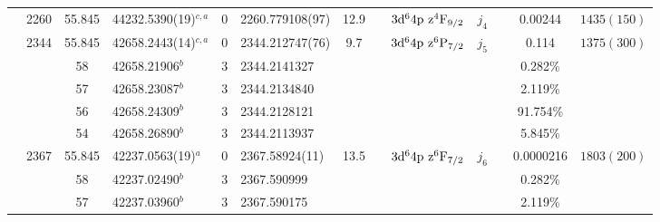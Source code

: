 \begin{table*}
\begin{center}
{\begin{tabular}{:l;l;c;l;c;l;c;l;l;c;c;c;c}
                                  & 2260   & 55.845    & 44232.5390(19)$^{c,a}$           & 0 &   2260.779108(97)  & 12.9 & $                                        $ & $3\rm{d}^64\rm{p~z}^4\rm{F}_{9/2}        $ & $j_{4} $ &              & 0.00244   & $ 1435(150)$\\
                                  & 2344   & 55.845    & 42658.2443(14)$^{c,a}$           & 0 &   2344.212747(76)  &  9.7 & $                                        $ & $3\rm{d}^64\rm{p~z}^6\rm{P}_{7/2}        $ & $j_{5} $ &              & 0.114     & $ 1375(300)$\\
\rowstyle{\itshape}               &        & 58        & 42658.21906$^{b}$                & 3 &  2344.2141327      &      & $                                        $ & $                                        $ & $      $ &              & 0.282\%   & $          $\\
\rowstyle{\itshape}               &        & 57        & 42658.23087$^{b}$                & 3 &  2344.2134840      &      & $                                        $ & $                                        $ & $      $ &              & 2.119\%   & $          $\\
\rowstyle{\itshape}               &        & 56        & 42658.24309$^{b}$                & 3 &  2344.2128121      &      & $                                        $ & $                                        $ & $      $ &              & 91.754\%  & $          $\\
\rowstyle{\itshape}               &        & 54        & 42658.26890$^{b}$                & 3 &  2344.2113937      &      & $                                        $ & $                                        $ & $      $ &              & 5.845\%   & $          $\\
                                  & 2367   & 55.845    & 42237.0563(19)$^{a}$             & 0 &    2367.58924(11)  & 13.5 & $                                        $ & $3\rm{d}^64\rm{p~z}^6\rm{F}_{7/2}        $ & $j_{6} $ &              & 0.0000216 & $ 1803(200)$\\
\rowstyle{\itshape}               &        & 58        & 42237.02490$^{b}$                & 3 &   2367.590999      &      & $                                        $ & $                                        $ & $      $ &              & 0.282\%   & $          $\\
\rowstyle{\itshape}               &        & 57        & 42237.03960$^{b}$                & 3 &   2367.590175      &      & $                                        $ & $                                        $ & $      $ &              & 2.119\%   & $          $\\

\end{tabular}}
\end{center}
\end{table*}
